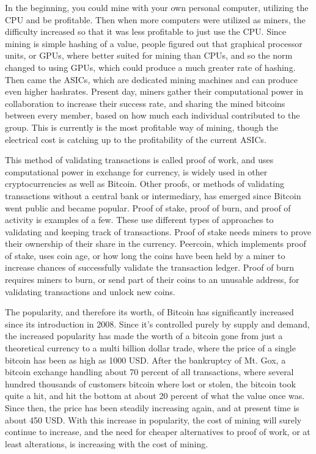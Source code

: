 \documentclass[11pt]{article}
\begin{document}
In the beginning, you could mine with your own personal computer, utilizing the CPU and be profitable. Then when more computers were utilized as miners, the difficulty increased so that it was less profitable to just use the CPU. Since mining is  simple hashing of a value, people figured out that graphical processor units, or GPUs, where better suited for mining than CPUs, and so the norm changed to using GPUs, which could produce a much greater rate of hashing. Then came the ASICs, which are dedicated mining machines and can produce even higher hashrates. Present day, miners gather their computational power in collaboration to increase their success rate, and sharing the mined bitcoins between every member, based on how much each individual contributed to the group. This is currently is the most profitable way of mining, though the electrical cost is catching up to the profitability of the current ASICs.

This method of validating transactions is called proof of work, and uses computational power in exchange for currency, is widely used in other cryptocurrencies as well as Bitcoin. Other proofs, or methods of validating transactions without a central bank or intermediary, has emerged since Bitcoin went public and became popular. Proof of stake, proof of burn, and proof of activity is examples of a few. These use different  types of approaches to validating and keeping track of transactions. Proof of stake needs miners to prove their ownership of their share in the currency. Peercoin, which implements proof of stake, uses coin age, or how long the coins have been held by a miner to increase chances of successfully validate the transaction ledger. Proof of burn requires miners to burn, or send part of their coins to an unusable address, for validating transactions and unlock new coins. 
	  
The popularity, and therefore its worth, of Bitcoin has significantly increased since its introduction in 2008. Since it’s controlled purely by supply and demand, the increased popularity has made the worth of a bitcoin gone from just a theoretical currency to a multi billion dollar trade, where the price of a single bitcoin has been as high as 1000 USD. After the bankruptcy of Mt. Gox, a bitcoin exchange handling about 70 percent of all transactions, where several hundred thousands of customers bitcoin where lost or stolen, the bitcoin took quite a hit, and hit the bottom at about 20 percent of what the value once was. Since then, the price has been steadily increasing again, and at present time is about 450 USD. With this increase in popularity, the cost of mining will surely continue to increase, and the need for cheaper alternatives to proof of work, or at least alterations, is increasing with the cost of mining.  
\end{document}
